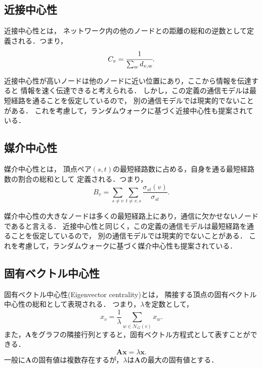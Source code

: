 \subsection{近接中心性}
\label{subsect:closeness}

近接中心性\cite{Bavelas1948,Beauchamp1965}とは，
ネットワーク内の他のノードとの距離の総和の逆数として定義される．つまり，
\begin{equation*}
  C_v=\cfrac{1}{\sum_wd_{v,w}}.
\end{equation*}

近接中心性が高いノードは他のノードに近い位置にあり，ここから情報を伝達すると
情報を速く伝達できると考えられる．
しかし，この定義の通信モデルは最短経路を通ることを仮定しているので，
別の通信モデルでは現実的でないことがある．
これを考慮して，ランダムウォークに基づく近接中心性も提案されている\cite{White2003}．

\subsection{媒介中心性}
\label{subsect:betweenness}

媒介中心性\cite{Anthonisse1971,Freeman1977}とは，
頂点ペア$(s,t)$の最短経路数に占める，自身を通る最短経路数の割合の総和として
定義される．つまり，
\begin{equation*}
  B_v=\sum_{s\neq v}\sum_{t\neq {v,s}}\frac{\sigma_{st}(v)}{\sigma_{st}}.
\end{equation*}

媒介中心性の大きなノードは多くの最短経路上にあり，通信に欠かせないノードであると言える．
近接中心性と同じく，この定義の通信モデルは最短経路を通ることを仮定しているので，
別の通信モデルでは現実的でないことがある．
これを考慮して，ランダムウォークに基づく媒介中心性も提案されている\cite{Newman2005}．

\subsection{固有ベクトル中心性}
\label{subsect:eigenvector}

固有ベクトル中心性(Eigenvector centrality)\cite{Bonacich1991}とは，
隣接する頂点の固有ベクトル中心性の総和として表現される．
つまり，$\lambda$を定数として，
\begin{equation*}
  x_v=\frac{1}{\lambda}\sum_{w\in\mathcal{N}_G(v)}x_w.
\end{equation*}
また，$\mathbf{A}$をグラフの隣接行列とすると，固有ベクトル方程式として表すことができる．
\begin{equation*}
  \mathbf{A}\mathbf{x}=\lambda\mathbf{x}.
\end{equation*}
一般に$\mathbf{A}$の固有値は複数存在するが，$\lambda$は$\mathbf{A}$の最大の固有値とする．

